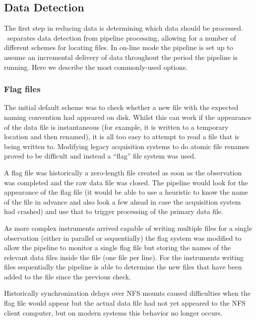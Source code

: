 \documentclass[final,authoryear,5p,times,twocolumn]{elsarticle}
\begin{document}
\subsection{Data Detection}

The first step in reducing data is determining which data should be
processed. \oracdr\ separates data detection from pipeline processing,
allowing for a number of different schemes for locating files. In
on-line mode the pipeline is set up to assume an incremental delivery
of data throughout the period the pipeline is running. Here we
describe the most commonly-used options.

\subsubsection{Flag files}

The initial default scheme was to check whether a new file with the
expected naming convention had appeared on disk. Whilst this can work
if the appearance of the data file is instantaneous (for example, it
is written to a temporary location and then renamed), it is all too
easy to attempt to read a file that is being written to. Modifying
legacy acquisition systems to do atomic file renames proved to be
difficult and instead a ``flag'' file system was used.

A flag file was historically a zero-length file created as soon as the
observation was completed and the raw data file was closed. The
pipeline would look for the appearance of the flag file (it would be
able to use a heuristic to know the name of the file in advance and
also look a few ahead in case the acquisition system had crashed) and
use that to trigger processing of the primary data file.

As more complex instruments arrived capable of writing multiple files
for a single observation (either in parallel or sequentially)
\citep{2009MNRAS.399.1026B,2013MNRAS.430.2513H} the flag system was
modified to allow the pipeline to monitor a single flag file but
storing the names of the relevant data files inside the file (one file
per line). For the instruments writing files sequentially the pipeline
is able to determine the new files that have been added to the file
since the previous check.

Historically synchronization delays over NFS mounts caused
difficulties when the flag file would appear but the actual data file
had not yet appeared to the NFS client computer, but on modern systems
this behavior no longer occurs.
\end{document}

